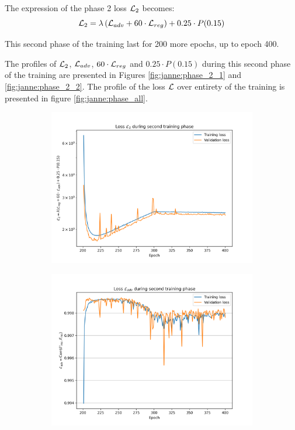\documentclass[../main.tex]{subfiles}
\begin{document}
The expression of the phase 2 loss ${\cal L}_2$ becomes:
\begin{equation}
  \label{eq:janne:phase_2:loss}
  {\cal L}_2 = \lambda \left( {\cal L}_{adv} + 60 \cdot {\cal L}_{reg} \right) + 0.25 \cdot P(0.15)
\end{equation}


This second phase of the training last for 200 more epochs, up to epoch 400.

The profiles of ${\cal L}_2$, ${\cal L}_{adv}$, $60 \cdot {\cal L}_{reg}$ and $0.25 \cdot P(0.15)$ during this second phase of the training are presented in Figures \ref{fig:janne:phase_2_1} and \ref{fig:janne:phase_2_2}. The profile of the loss ${\cal L}$ over entirety of the training is presented in figure \ref{fig:janne:phase_all}.

\begin{figure}
  \centering
  \begin{subfigure}[t]{0.48\linewidth}
    \includegraphics[width=\linewidth]{images/janne/training/phase_2_loss.png}
  \end{subfigure}
  \hfill
  \begin{subfigure}[t]{0.48\linewidth}
    \includegraphics[width=\linewidth]{images/janne/training/phase_2_loss_adv.png}

\end{subfigure}
\end{figure}
\end{document}
